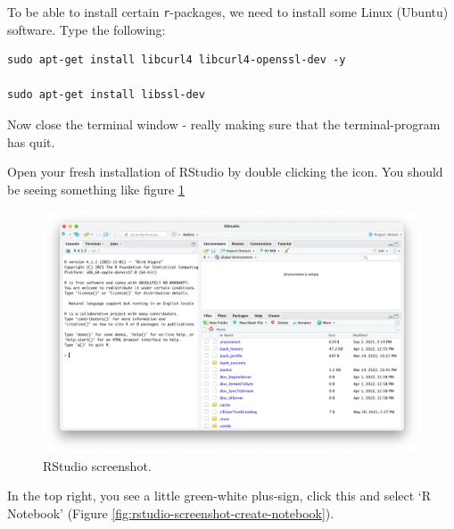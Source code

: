 \documentclass[
]{book}
\newcommand{\passthrough}[1]{#1}
\begin{document}
To be able to install certain \passthrough{\lstinline!r!}-packages, we need to install some Linux (Ubuntu) software. Type the following:

\begin{lstlisting}
sudo apt-get install libcurl4 libcurl4-openssl-dev -y

sudo apt-get install libssl-dev
\end{lstlisting}

Now close the terminal window - really making sure that the terminal-program has quit.

Open your fresh installation of RStudio by double clicking the icon. You should be seeing something like figure \ref{fig:rstudio-screenshot}

\begin{figure}

{\centering \includegraphics[width=34.5in]{img/rstudio-screenshot} 

}

\caption{RStudio screenshot.}\label{fig:rstudio-screenshot}
\end{figure}

In the top right, you see a little green-white plus-sign, click this and select `R Notebook' (Figure \ref{fig:rstudio-screenshot-create-notebook}).
\end{document}
